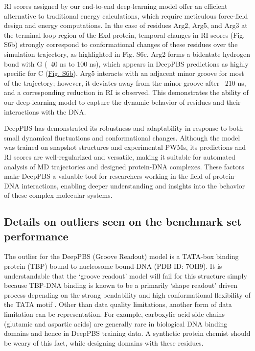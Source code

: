 RI scores assigned by our end-to-end deep-learning model offer an efficient alternative to traditional energy calculations, which require meticulous force-field design and energy computations. In the case of residues Arg2, Arg5, and Arg3 at the terminal loop region of the Exd protein, temporal changes in RI scores (Fig. S6b) strongly correspond to conformational changes of these residues over the simulation trajectory, as highlighted in Fig. S6c. Arg2 forms a bidentate hydrogen bond with G (~40 ns to 100 ns), which appears in DeepPBS predictions as highly specific for C (\hyperref[fig:pdnaS6]{Fig. S6b}). Arg5 interacts with an adjacent minor groove for most of the trajectory; however, it deviates away from the minor groove after ~210 ns, and a corresponding reduction in RI is observed. This demonstrates the ability of our deep-learning model to capture the dynamic behavior of residues and their interactions with the DNA.

DeepPBS has demonstrated its robustness and adaptability in response to both small dynamical fluctuations and conformational changes. Although the model was trained on snapshot structures and experimental PWMs, its predictions and RI scores are well-regularized and versatile, making it suitable for automated analysis of MD trajectories and designed protein-DNA complexes. These factors make DeepPBS a valuable tool for researchers working in the field of protein-DNA interactions, enabling deeper understanding and insights into the behavior of these complex molecular systems.

\subsection{Details on outliers seen on the benchmark set performance}

The outlier for the DeepPBS (Groove Readout) model is a TATA-box binding protein (TBP) bound to nucleosome bound-DNA (PDB ID: 7OH9). It is understandable that the ‘groove readout’ model will fail for this structure simply because TBP-DNA binding is known to be a primarily ‘shape readout’ driven process depending on the strong bendability and high conformational flexibility of the TATA motif \citep{simon2006}. Other than data quality limitations, another form of data limitation can be representation. For example, carboxylic acid side chains (glutamic and aspartic acids) are generally rare in biological DNA binding domains and hence in DeepPBS training data. A synthetic protein chemist should be weary of this fact, while designing domains with these residues. 

